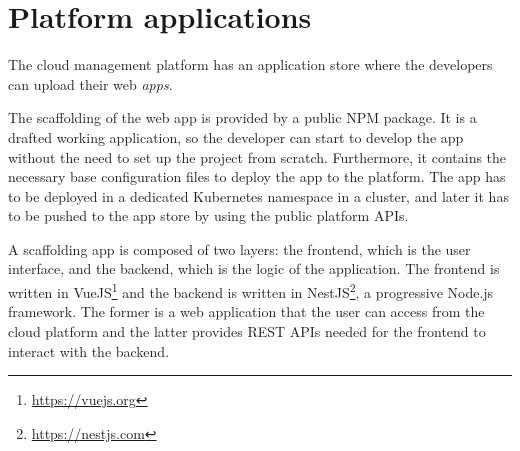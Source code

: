 \section{Platform applications}
\label{sec:platform-applications}

The cloud management platform has an application store where the developers can upload their web \textit{apps}.

The scaffolding of the web app is provided by a public NPM package. It is a drafted working application, so the developer can start to develop the app without the need to set up the project from scratch. Furthermore, it contains the necessary base configuration files to deploy the app to the platform. The app has to be deployed in a dedicated Kubernetes namespace in a cluster, and later it has to be pushed to the app store by using the public platform APIs.

A scaffolding app is composed of two layers: the frontend, which is the user interface, and the backend, which is the logic of the application. The frontend is written in VueJS\footnote{\url{https://vuejs.org}} and the backend is written in NestJS\footnote{\url{https://nestjs.com}}, a progressive Node.js framework. The former is a web application that the user can access from the cloud platform and the latter provides REST APIs needed for the frontend to interact with the backend.
